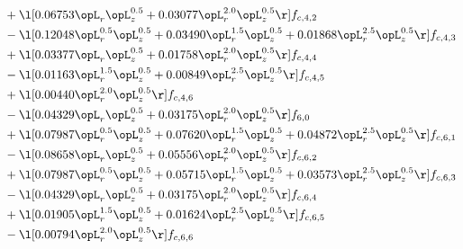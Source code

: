 \begin{alignat}{2}
& + \l[  0.06753 \opL_r \opL_z^{0.5} +  0.03077 \opL_r^{2.0} \opL_z^{0.5}  \r] f_{c,4,2} \nonumber \\ 
& - \l[  0.12048 \opL_r^{0.5} \opL_z^{0.5} +  0.03490 \opL_r^{1.5} \opL_z^{0.5} +  0.01868 \opL_r^{2.5} \opL_z^{0.5}  \r] f_{c,4,3} \nonumber \\ 
& + \l[  0.03377 \opL_r \opL_z^{0.5} +  0.01758 \opL_r^{2.0} \opL_z^{0.5}  \r] f_{c,4,4} \nonumber \\ 
& - \l[  0.01163 \opL_r^{1.5} \opL_z^{0.5} +  0.00849 \opL_r^{2.5} \opL_z^{0.5}  \r] f_{c,4,5} \nonumber \\ 
& + \l[  0.00440 \opL_r^{2.0} \opL_z^{0.5}  \r] f_{c,4,6} \nonumber \\ 
& - \l[  0.04329 \opL_r \opL_z^{0.5} +  0.03175 \opL_r^{2.0} \opL_z^{0.5}  \r] f_{6,0} \nonumber \\ 
& + \l[  0.07987 \opL_r^{0.5} \opL_z^{0.5} +  0.07620 \opL_r^{1.5} \opL_z^{0.5} +  0.04872 \opL_r^{2.5} \opL_z^{0.5}  \r] f_{c,6,1} \nonumber \\ 
& - \l[  0.08658 \opL_r \opL_z^{0.5} +  0.05556 \opL_r^{2.0} \opL_z^{0.5}  \r] f_{c,6,2} \nonumber \\ 
& + \l[  0.07987 \opL_r^{0.5} \opL_z^{0.5} +  0.05715 \opL_r^{1.5} \opL_z^{0.5} +  0.03573 \opL_r^{2.5} \opL_z^{0.5}  \r] f_{c,6,3} \nonumber \\ 
& - \l[  0.04329 \opL_r \opL_z^{0.5} +  0.03175 \opL_r^{2.0} \opL_z^{0.5}  \r] f_{c,6,4} \nonumber \\ 
& + \l[  0.01905 \opL_r^{1.5} \opL_z^{0.5} +  0.01624 \opL_r^{2.5} \opL_z^{0.5}  \r] f_{c,6,5} \nonumber \\ 
& - \l[  0.00794 \opL_r^{2.0} \opL_z^{0.5}  \r] f_{c,6,6} \nonumber \\ 
\end{alignat} 


